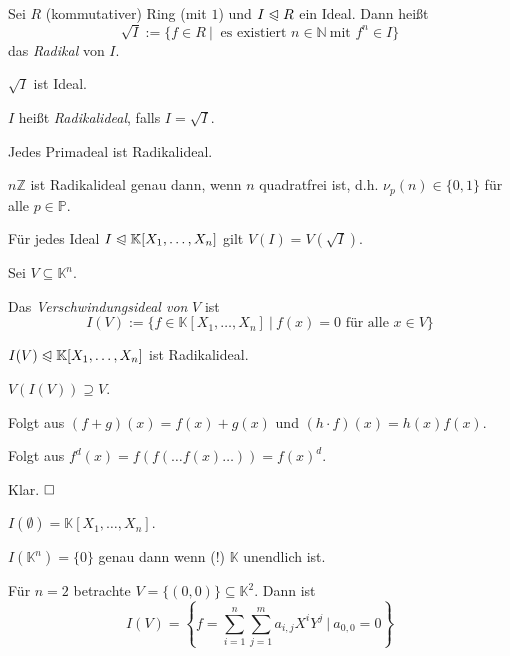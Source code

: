 \documentclass[11pt]{book}
\theoremstyle{nonumberbreak}
\newenvironment{pr}[1][]{\ifthenelse{\equal{#1}{}}{\proof}{\proof[#1]}\rm}{\endproof}
\newenvironment{ex}[1][]{\ifthenelse{\equal{#1}{}}{\example}{\example[#1]}\rm}{\endexample}
\newenvironment{bemdefin}[1][]{\ifthenelse{\equal{#1}{}}{\bemdefini}{\bemdefini[#1]}\rm}{\endbemdefini}
\newenvironment{definbem}[1][]{\ifthenelse{\equal{#1}{}}{\definibem}{\definibem[#1]}\rm}{\enddefinibem}
\begin{document}
\begin{spacing}{1.3}
\begin{bemdefin}
\begin{compactenum}
\item Sei $R$ (kommutativer) Ring (mit $1$) und $I \trianglelefteqslant R$ ein Ideal. Dann heißt
$$\sqrt{I}:= \{f \in R \ \vert \ \textrm{ es existiert } n \in \mathbb{N} \ \textrm{mit } f^n \in I \}$$
das \textit{Radikal} von $I$.
\item $\sqrt{I}$ ist Ideal.
\item $I$ heißt \textit{Radikalideal}, falls $I=\sqrt{I}$.
\item Jedes Primadeal ist Radikalideal.
\item $n\mathbb{Z}$ ist Radikalideal genau dann, wenn $n$ quadratfrei ist, d.h. $\nu_p(n)\in \{0,1\}$ für alle $p \in \mathbb{P}$.
\item Für jedes Ideal $I \trianglelefteqslant \mathbb{K}[X_1, \ldots, X_n]$ gilt
$V(I)=V(\sqrt{I})$.
\end{compactenum}

\end{bemdefin}

\begin{definbem} %

Sei $V \subseteq \mathbb{K}^n$.
\begin{compactenum}
\item Das \textit{Verschwindungsideal von} $V$ ist 
$$I(V):=\{f \in \mathbb{K}[X_1, \ldots, X_n] \ \vert \ f(x)=0 \textrm{ für alle } x \in V \}$$
\item $I(V) \trianglelefteqslant \mathbb{K}[X_1, \ldots, X_n]$ ist Radikalideal.
\item $V(I(V))\supseteq V$.
\end{compactenum}
\begin{pr}
\begin{compactenum}
\item Folgt aus $(f+g)(x)=f(x)+g(x)$ und $(h\cdot f)(x)=h(x)f(x)$.
\item Folgt aus $f^d(x)=f(f(\ldots f(x) \ldots ))=f(x)^d$.
\item Klar. $\hfill \Box$
\end{compactenum}
\end{pr}
\end{definbem}

\begin{ex} %
\begin{compactenum}
\item $I(\emptyset)=\mathbb{K}[X_1, \ldots, X_n]$.
\item $I(\mathbb{K}^n)=\{0\}$ genau dann wenn (!) $\mathbb{K}$ unendlich ist.
\item Für $n=2$ betrachte $V=\{(0,0)\} \subseteq \mathbb{K}^2$. Dann ist
$$I(V)=\left\{f=\sum_{i=1}^n \sum_{j=1}^m a_{i,j} X^{i} Y^{j} \ \bigg \vert \ a_{0,0}=0 \right\}$$
\end{compactenum}
\end{ex}


\end{spacing}
\end{document}
